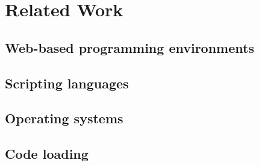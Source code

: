 \section{Related Work}
\label{sec:related}

\subsection{Web-based programming environments}


\subsection{Scripting languages}


\subsection{Operating systems}



\subsection{Code loading}

